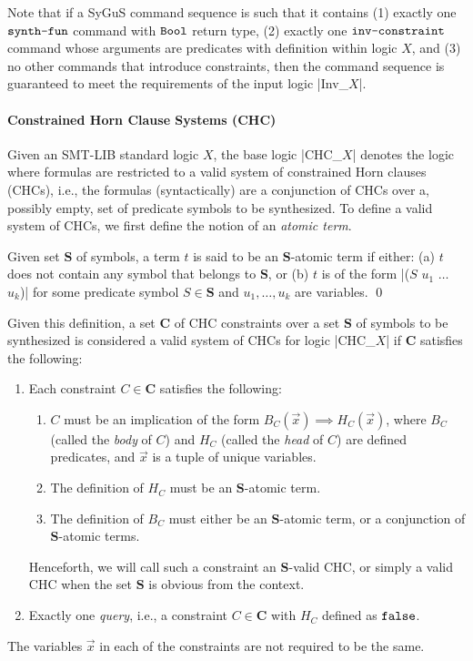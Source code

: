 \documentclass[english,a4paper,10pt]{article}
\begin{document}
Note that if a SyGuS command sequence is such that it contains
(1) exactly one $\texttt{synth-fun}$ command with $\texttt{Bool}$ return type,
(2) exactly one $\texttt{inv-constraint}$ command whose arguments are predicates with definition within logic $X$, and
(3) no other commands that introduce constraints,
then the command sequence is guaranteed to meet the requirements of the input logic \code|Inv_$X$|.

\paragraph{Constrained Horn Clause Systems (CHC)}
Given an SMT-LIB standard logic $X$,
the base logic \code|CHC_$X$| denotes the logic
where formulas are restricted to a valid system of constrained Horn clauses (CHCs),
i.e., the formulas (syntactically) are a conjunction of CHCs
over a, possibly empty, set of predicate symbols to be synthesized.
To define a valid system of CHCs, we first define the notion of an \emph{atomic term}.

\begin{definition}
Given set $\mathbf{S}$ of symbols,
a term $t$ is said to be an $\mathbf{S}$-atomic term if either:
(a) $t$ does not contain any symbol that belongs to $\mathbf{S}$, or
(b) $t$ is of the form \code|($S$ $u_1$ $\ldots$ $u_k$)|
for some predicate symbol $S \in \mathbf{S}$ and $u_1, \ldots, u_k$ are variables.
\qed
\end{definition}

Given this definition, a set $\mathbf{C}$ of CHC constraints
over a set $\mathbf{S}$ of symbols to be synthesized
is considered a valid system of CHCs for logic \code|CHC_$X$|
if $\mathbf{C}$ satisfies the following:
\begin{enumerate}
  \item Each constraint $C \in \mathbf{C}$ satisfies the following:
        \begin{enumerate}
        \item $C$ must be an implication of the form $B_C(\vec x) \implies H_C(\vec x)$,
              where $B_C$ (called the \emph{body} of $C$) and $H_C$ (called the \emph{head} of $C$)
              are defined predicates, and $\vec x$ is a tuple of unique variables.

        \item The definition of $H_C$ must be an $\mathbf{S}$-atomic term.
        
        \item The definition of $B_C$ must either be an $\mathbf{S}$-atomic term,
              or a conjunction of $\mathbf{S}$-atomic terms.
        \end{enumerate}
        Henceforth, we will call such a constraint an $\mathbf{S}$-valid CHC,
        or simply a valid CHC when the set $\mathbf{S}$ is obvious from the context.

  \item Exactly one \emph{query}, i.e., a constraint $C \in \mathbf{C}$ with $H_C$ defined as $\texttt{false}$.
\end{enumerate}
The variables $\vec x$ in each of the constraints are not required to be the same.
\end{document}

